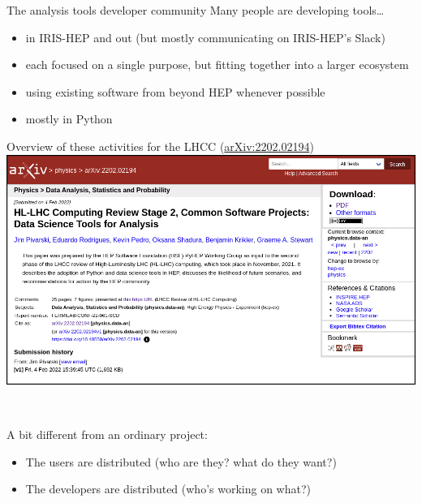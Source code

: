 \documentclass[aspectratio=169]{beamer}
\begin{document}
\begin{frame}{The analysis tools developer community}
\large
{\Large Many people are developing tools\ldots}

\vspace{0.5 cm}
\begin{itemize}\setlength{\itemsep}{0.25 cm}
\item<2-> in IRIS-HEP and out (but mostly communicating on IRIS-HEP's Slack)
\item<3-> each focused on a single purpose, but fitting together into a larger ecosystem
\item<4-> using existing software from beyond HEP whenever possible
\item<5-> mostly in Python
\end{itemize}
\end{frame}

\begin{frame}{Overview of these activities for the LHCC (\href{https://arxiv.org/abs/2202.02194}{arXiv:2202.02194})}
\vspace{0.22 cm}
\includegraphics[width=\linewidth]{hl-lhc-data-science-tools-arXiv.png}
\end{frame}

\begin{frame}{\mbox{ }}
\begin{center}
\begin{minipage}{0.85\linewidth}
\large
{\Large A bit different from an ordinary project:}

\vspace{0.25 cm}
\begin{itemize}\setlength{\itemsep}{0.25 cm}
\item The users are distributed (who are they? what do they want?)
\item The developers are distributed (who's working on what?)
\end{itemize}
\end{minipage}
\end{center}
\end{frame}
\end{document}
